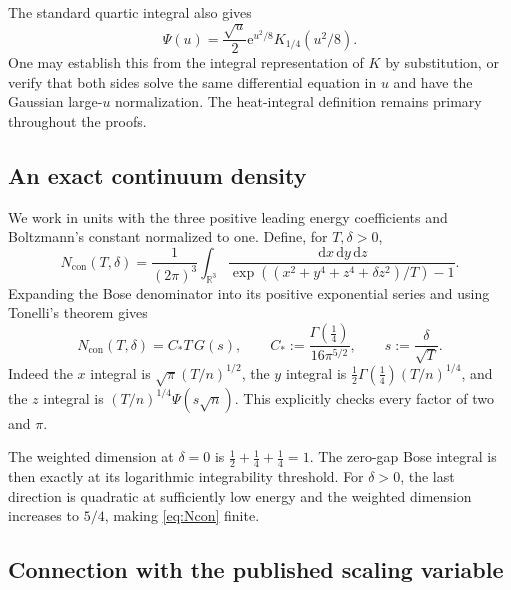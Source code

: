 \documentclass[11pt,a4paper]{article}
\numberwithin{equation}{section}
\theoremstyle{definition}
\newcommand{\R}{\mathbb R}
\newcommand{\dd}{\,\mathrm d}
\newcommand{\con}{\mathrm{con}}
\newcommand{\e}{\mathrm e}
\newcommand{\gfour}{\Gamma(\tfrac14)}
\begin{document}
The standard quartic integral also gives
\begin{equation}
 \Psi(u)=\frac{\sqrt u}{2}\e^{u^2/8}K_{1/4}(u^2/8).
 \label{eq:bessel}
\end{equation}
One may establish this from the integral representation of $K$ by
substitution, or verify that both sides solve the same differential
equation in $u$ and have the Gaussian large-$u$ normalization.
The heat-integral definition remains primary throughout the proofs.

\subsection{An exact continuum density}

We work in units with the three positive leading energy coefficients and
Boltzmann's constant normalized to one. Define, for $T,\delta>0$,
\begin{equation}
 N_{\con}(T,\delta)=\frac1{(2\pi)^3}\int_{\R^3}
 \frac{\dd x\dd y\dd z}
 {\exp((x^2+y^4+z^4+\delta z^2)/T)-1}.
 \label{eq:Ncon}
\end{equation}
Expanding the Bose denominator into its positive exponential series and
using Tonelli's theorem gives
\begin{equation}
 N_{\con}(T,\delta)=C_* T\,G(s),\qquad
 C_*:=\frac{\gfour}{16\pi^{5/2}},\qquad s:=\frac\delta{\sqrt T}.
 \label{eq:normalization}
\end{equation}
Indeed the $x$ integral is $\sqrt\pi(T/n)^{1/2}$, the $y$ integral is
$\frac12\gfour(T/n)^{1/4}$, and the $z$ integral is
$(T/n)^{1/4}\Psi(s\sqrt n)$. This explicitly checks every factor of two
and $\pi$.

The weighted dimension at $\delta=0$ is
$\frac12+\frac14+\frac14=1$. The zero-gap Bose integral is then exactly
at its logarithmic integrability threshold. For $\delta>0$, the last
direction is quadratic at sufficiently low energy and the weighted
dimension increases to $5/4$, making \eqref{eq:Ncon} finite.

\subsection{Connection with the published scaling variable}
\end{document}
